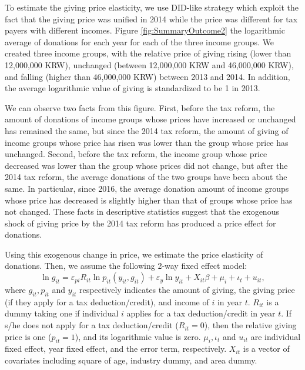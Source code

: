 \documentclass[
  11pt,
  a4paper,
]{article}
\begin{document}
To estimate the giving price elasticity,
we use DID-like strategy which exploit the fact that the giving price was unified in 2014
while the price was different for tax payers with different incomes.
Figure \ref{fig:SummaryOutcome2} the logarithmic average of donations for each year for each of the three income groups.
We created three income groups, with the relative price of giving rising (lower than 12,000,000 KRW),
unchanged (between 12,000,000 KRW and 46,000,000 KRW),
and falling (higher than 46,000,000 KRW) between 2013 and 2014.
In addition, the average logarithmic value of giving is standardized to be 1 in 2013.

We can observe two facts from this figure.
First, before the tax reform, the amount of donations of income groups whose prices have increased or unchanged has remained the same,
but since the 2014 tax reform, the amount of giving of income groups whose price has risen was lower than the group whose price has unchanged.
Second, before the tax reform, the income group whose price decreased was lower than the group whose prices did not change,
but after the 2014 tax reform, the average donations of the two groups have been about the same.
In particular, since 2016,
the average donation amount of income groups whose price has decreased is slightly higher than that of groups whose price has not changed.
These facts in descriptive statistics suggest that
the exogenous shock of giving price by the 2014 tax reform has produced a price effect for donations.

Using this exogenous change in price, we estimate the price elasticity of donations.
Then, we assume the following 2-way fixed effect model:
\begin{equation}
    \ln g_{it} = \varepsilon_{pi} R_{it} \ln p_{it}(y_{it}, g_{it}) + \varepsilon_y \ln y_{it} 
    + X_{it}\beta +\mu_i +\iota_t +u_{it}, \label{eq:intensive}
\end{equation}
where \(g_{it}, p_{it}\) and \(y_{it}\) respectively indicates
the amount of giving, the giving price (if they apply for a tax deduction/credit), and income of \(i\) in year \(t\).
\(R_{it}\) is a dummy taking one if individual \(i\) applies for a tax deduction/credit in year \(t\).
If s/he does not apply for a tax deduction/credit (\(R_{it} = 0\)), then the relative giving price is one (\(p_{it} = 1\)),
and its logarithmic value is zero.
\(\mu_i, \iota_t\) and \(u_{it}\) are individual fixed effect, year fixed effect, and the error term, respectively.
\(X_{it}\) is a vector of covariates including square of age, industry dummy, and area dummy.
\end{document}
